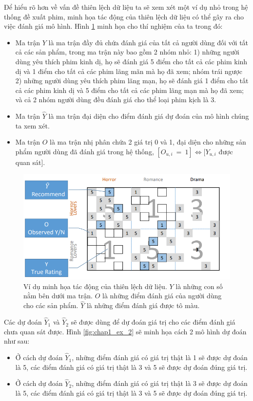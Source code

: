 Để hiểu rõ hơn về vấn đề thiên lệch dữ liệu ta sẽ xem xét một ví dụ nhỏ trong hệ thống đề xuất phim, minh họa tác động của thiên lệch dữ liệu có thể gây ra cho việc đánh giá mô hình. Hình \ref{fig:chap1_ex_1} minh họa cho thí nghiệm của ta trong đó:
\begin{itemize}
    \item Ma trận $Y$ là ma trận đầy đủ chứa đánh giá của tất cả người dùng đối với tất cả các sản phẩm, trong ma trận này bao gồm 2 nhóm nhỏ: 1) những người dùng yêu thích phim kinh dị, họ sẽ đánh giá 5 điểm cho tất cả các phim kinh dị và 1 điểm cho tất cả các phim lãng mãn mà họ đã xem; nhóm trái ngược 2) những người dùng yêu thích phim lãng mạn, họ sẽ đánh giá 1 điểm cho tất cả các phim kinh dị và 5 điểm cho tất cả các phim lãng mạn mà họ đã xem; và cả 2 nhóm người dùng đều đánh giá cho  thể loại phim kịch là 3. 
    \item Ma trận $\hat{Y}$ là ma trận đại diện cho điểm đánh giá dự đoán của mô hình chúng ta xem xét. 
    \item Ma trận $O$ là ma trận nhị phân chứa 2 giá trị 0 và 1, đại diện cho những sản phẩm người dùng đã đánh giá trong hệ thống, \( [O_{u,i}~=~1]\Leftrightarrow[Y_{u,i} \) được quan sát].
\end{itemize}

\begin{figure}[h]
    \centering
    \includegraphics[width=\textwidth]{Chapter1/example_bias_1.png}
    \caption{Ví dụ minh họa tác động của thiên lệch dữ liệu. 
    $Y$ là những con số nằm bên dưới ma trận.
    $O$ là những điểm đánh giá của người dùng cho các sản phẩm.
    $\hat{Y}$ là những điểm đánh giá được tô màu.}
    \label{fig:chap1_ex_1}
\end{figure}

Các dự đoán $\hat{Y}_1$ và  $\hat{Y}_2$ sẽ được dùng để dự đoán giá trị cho các điểm đánh giá chưa quan sát được. Hình \ref{fig:chap1_ex_2} sẽ minh họa cách 2 mô hình dự đoán như sau:
\begin{itemize}
    \item Ở cách dự đoán $\hat{Y}_1$, những điểm đánh giá có giá trị thật là 1 sẽ được dự đoán là 5, các điểm đánh giá có giá trị thật là 3 và 5 sẽ được dự đoán đúng giá trị.
    \item Ở cách dự đoán $\hat{Y}_2$, những điểm đánh giá có giá trị thật là 3 sẽ được dự đoán là 5, các điểm đánh giá có giá trị thật là 3 và 5 sẽ được dự đoán đúng giá trị.
\end{itemize}

